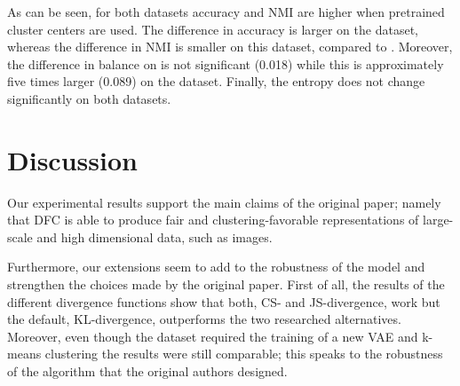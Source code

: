 As can be seen, for both datasets accuracy and NMI are higher when pretrained cluster centers are used. The difference in accuracy is larger on the \USPSMNIST dataset, whereas the difference in NMI is smaller on this dataset, compared to \revMNIST. Moreover, the difference in balance on \USPSMNIST is not significant (0.018) while this is approximately five times larger (0.089) on the \revMNIST dataset. Finally, the entropy does not change significantly on both datasets.




\section{Discussion}


Our experimental results support the main claims of the original paper; namely that DFC is able to produce fair and clustering-favorable representations of large-scale and high dimensional data, such as images. 

Furthermore, our extensions seem to add to the robustness of the model and strengthen the choices made by the original paper. First of all, the results of the different divergence functions show that both, CS- and JS-divergence, work but the default, KL-divergence, outperforms the two researched alternatives. Moreover, even though the \revMNIST dataset required the training of a new VAE and k-means clustering the results were still comparable; this speaks to the robustness of the algorithm that the original authors designed.

